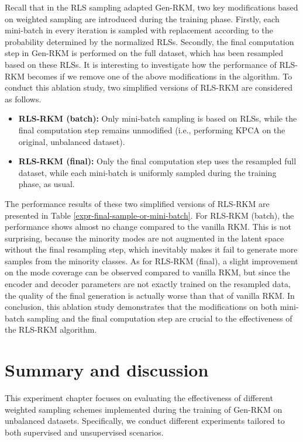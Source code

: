 \begin{description}[leftmargin=0pt]
    \item[Significance of mini-batch sampling and final step resampling ] Recall that in the RLS sampling adapted Gen-RKM, two key modifications based on weighted sampling are introduced during the training phase. Firstly, each mini-batch in every iteration is sampled with replacement according to the probability determined by the normalized RLSs. Secondly, the final computation step in Gen-RKM is performed on the full dataset, which has been resampled based on these RLSs. It is interesting to investigate how the performance of RLS-RKM becomes if we remove one of the above modifications in the algorithm. To conduct this ablation study, two simplified versions of RLS-RKM are considered as follows.
    \begin{itemize}
        \item \textbf{RLS-RKM (batch): }Only mini-batch sampling is based on RLSs, while the final computation step remains unmodified (i.e., performing KPCA on the original, unbalanced dataset). 

        \item \textbf{RLS-RKM (final): }Only the final computation step uses the resampled full dataset, while each mini-batch is uniformly sampled during the training phase, as usual.
    \end{itemize}
    The performance results of these two simplified versions of RLS-RKM are presented in Table \ref{expr-final-sample-or-mini-batch}. For RLS-RKM (batch), the performance shows almost no change compared to the vanilla RKM. This is not surprising, because the minority modes are not augmented in the latent space without the final resampling step, which inevitably makes it fail to generate more samples from the minority classes. As for RLS-RKM (final), a slight improvement on the mode coverage can be observed compared to vanilla RKM, but since the encoder and decoder parameters are not exactly trained on the resampled data, the quality of the final generation is actually worse than that of vanilla RKM. In conclusion, this ablation study demonstrates that the modifications on both mini-batch sampling and the final computation step are crucial to the effectiveness of the RLS-RKM algorithm.
    
\end{description}


\section{Summary and discussion}
\label{sec-expr-summary}
This experiment chapter focuses on evaluating the effectiveness of different weighted sampling schemes implemented during the training of Gen-RKM on unbalanced datasets. Specifically, we conduct different experiments tailored to both supervised and unsupervised scenarios.

